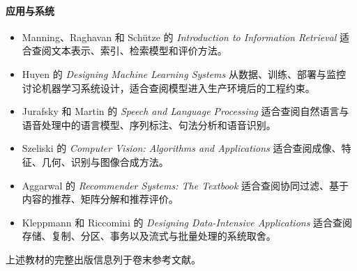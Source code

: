 \paragraph*{应用与系统}
\begin{itemize}
  \item Manning、Raghavan 和 Schütze 的 \emph{Introduction to Information Retrieval}
    适合查阅文本表示、索引、检索模型和评价方法。
  \item Huyen 的 \emph{Designing Machine Learning Systems} 从数据、训练、部署与监控
    讨论机器学习系统设计，适合查阅模型进入生产环境后的工程约束。
  \item Jurafsky 和 Martin 的 \emph{Speech and Language Processing}
    适合查阅自然语言与语音处理中的语言模型、序列标注、句法分析和语音识别。
  \item Szeliski 的 \emph{Computer Vision: Algorithms and Applications}
    适合查阅成像、特征、几何、识别与图像合成方法。
  \item Aggarwal 的 \emph{Recommender Systems: The Textbook}
    适合查阅协同过滤、基于内容的推荐、矩阵分解和推荐评价。
  \item Kleppmann 和 Riccomini 的 \emph{Designing Data-Intensive Applications}
    适合查阅存储、复制、分区、事务以及流式与批量处理的系统取舍。
\end{itemize}

上述教材的完整出版信息列于卷末参考文献。
\nocite{mitchell1997,bishop2006,zhou2016machinelearning,li2019statisticallearning,deisenroth2020mathematics}
\nocite{hastie2009,shalevshwartz2014,mohri2018foundations,james2021statistical}
\nocite{pgm-murphy2012,murphy2022probabilistic,murphy2023advanced,pgm-koller2009,rasmussen2006}
\nocite{goodfellow2016,bishop2024deep,qiu2020neural,zhang2023dive,geron2022hands-on}
\nocite{sutton2018,szepesvari2010algorithms}
\nocite{manning2008ir,huyen2022designing,jurafsky2009speech,szeliski2022computer,aggarwal2016recommender,kleppmann2026designing}

